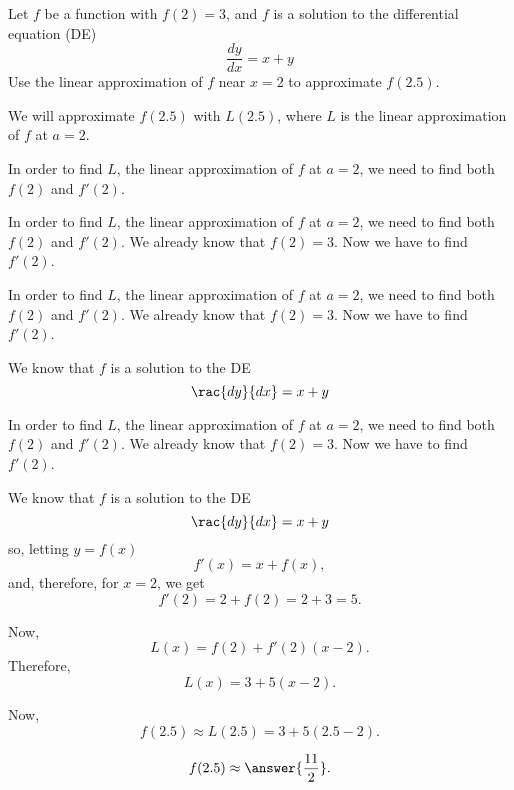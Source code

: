\documentclass{ximera}
\author{Steven Gubkin\and Nela Lakos}
\begin{document}
\begin{exercise}

Let $f$ be a function with $f(2) = 3$, and $f$ is a solution to the
differential equation (DE)
\[
\frac{dy}{dx} = x+y
\]
Use the linear approximation of $f$ near $x=2$ to approximate $f(2.5)$. 
\begin{hint}
We will approximate $f(2.5)$ with $L(2.5)$, where $L$ is the linear approximation of $f$ at $a=2$.
\end{hint}
\begin{hint}
In order to find $L$, the linear approximation of $f$ at $a=2$, we need to find both $f(2)$ and $f'(2)$.
\end{hint}
\begin{hint}
In order to find $L$, the linear approximation of $f$ at $a=2$, we need to find both $f(2)$ and $f'(2)$.
We already know that $f(2)=3$. Now we have to find $f'(2)$.
\end{hint}
\begin{hint}
In order to find $L$, the linear approximation of $f$ at $a=2$, we need to find both $f(2)$ and $f'(2)$.
We already know that $f(2)=3$. Now we have to find $f'(2)$.

We know that $f$ is a solution to the DE
\[
\rac{dy}{dx} = x+y
\]
\end{hint}

\begin{hint}
In order to find $L$, the linear approximation of $f$ at $a=2$, we need to find both $f(2)$ and $f'(2)$.
We already know that $f(2)=3$. Now we have to find $f'(2)$.

We know that $f$ is a solution to the DE
\[
\rac{dy}{dx} = x+y
\]
so, letting $y=f(x)$
\[
f'(x)= x+f(x),
\]
and, therefore, for $x=2$, we get
\[
f'(2)= 2+f(2)=2+3=5.
\]
\end{hint}
\begin{hint}
Now, 
\[
L(x)=f(2)+f'(2)(x-2).
\]
Therefore,
\[
L(x)=3+5(x-2).
\]
\end{hint}
\begin{hint}
Now, 
\[
f(2.5)\approx L(2.5)=3+5(2.5-2).
\]
\end{hint}
\[
f(2.5)\approx \answer{\frac{11}{2}}.
\]
\end{exercise}
\end{document}
